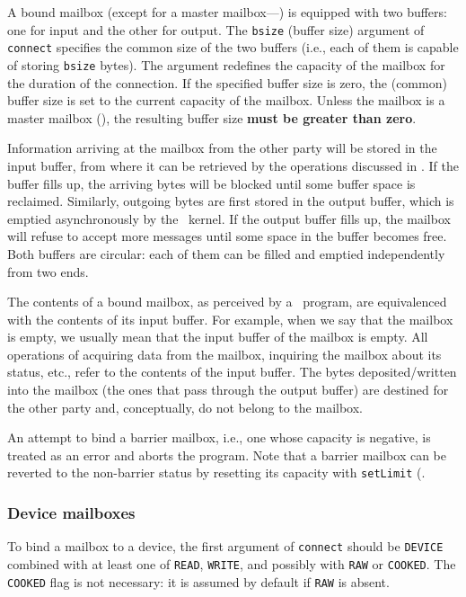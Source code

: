 A bound mailbox (except for a master mailbox---)
is equipped with two buffers: one for input and the other for output.
The {\tt bsize} (buffer size) argument of {\tt connect} specifies the
common size of the two buffers (i.e., each of them is capable of storing
{\tt bsize} bytes).
The argument redefines the capacity of the mailbox for the duration
of the connection.
If the specified buffer size is zero, the (common) buffer size is set to the
current capacity of the mailbox.
Unless the mailbox is a master mailbox (),
the resulting buffer size {\bf must be greater than zero}.

Information arriving at the mailbox from the other party will be stored
in the input buffer, from where it can be retrieved by the operations
discussed in .
If the buffer fills up, the arriving bytes will be blocked until some
buffer space is reclaimed.
Similarly, outgoing bytes are first stored in the output buffer, which is
emptied asynchronously by the \smurph\ kernel.
If the output buffer fills up, the mailbox will refuse to accept more
messages until some space in the buffer becomes free.
Both buffers are circular: each of them
can be filled and emptied independently from two ends.

The contents of a bound mailbox, as perceived by a \smurph\ program, are
equivalenced with the contents of its input buffer.
For example, when we say that the mailbox is empty, we usually mean that
the input buffer of the mailbox is empty.
All operations of acquiring data from the mailbox, inquiring the mailbox
about its status, etc., refer to the contents of the input buffer.
The bytes deposited/written into the mailbox (the ones that pass through the
output buffer) are destined for the other party and, conceptually, do not
belong to the mailbox.

An attempt to bind a barrier mailbox, i.e., one whose capacity is negative,
is treated as an error and aborts the program.
Note that a barrier mailbox can be reverted to the non-barrier status by
resetting its capacity with {\tt setLimit} (.

\subsubsection{Device mailboxes}
\label{rm_mb_bo_de}

To bind a mailbox to a device, the first argument of {\tt connect}
should be {\tt DEVICE} combined with at least one of {\tt READ},
{\tt WRITE}, and possibly with {\tt RAW} or {\tt COOKED}.
The {\tt COOKED} flag is not necessary: it is assumed by default if
{\tt RAW} is absent.

